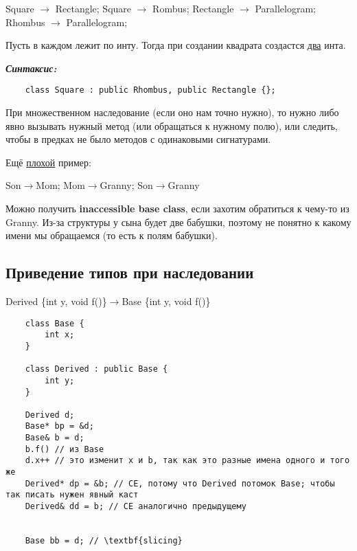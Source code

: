 \documentclass[12pt]{article}
\begin{document}
\begin{center}
	Square $\rightarrow$ Rectangle; Square $\rightarrow$ Rombus; Rectangle $\rightarrow$ Parallelogram; Rhombus $\rightarrow$ Parallelogram; 
\end{center}

Пусть в каждом лежит по инту. Тогда при создании квадрата создастся \underline{два} инта. 

\textbf{\textit{Синтаксис:}}

\begin{lstlisting}
	class Square : public Rhombus, public Rectangle {};
\end{lstlisting}

При множественном наследование (если оно нам точно нужно), то нужно либо явно вызывать нужный метод (или обращаться к нужному полю), или следить, чтобы в предках не было  методов с одинаковыми сигнатурами. 

Ещё \underline{плохой} пример:

\begin{center}
	Son$\rightarrow$Mom; Mom$\rightarrow$Granny; Son$\rightarrow$Granny
\end{center}

Можно получить \textbf{inaccessible base class}, если захотим обратиться к чему-то из Granny. Из-за структуры у сына будет две бабушки, поэтому не понятно к какому имени мы обращаемся (то есть к полям бабушки). 



\subsection{Приведение типов при наследовании}

\begin{center}
	Derived \{int y, void f()\}$\rightarrow$Base \{int y, void f()\}
\end{center}

\begin{lstlisting}
	class Base {
		int x;
	}
	
	class Derived : public Base {
		int y;
	}

	Derived d;
	Base* bp = &d;
	Base& b = d;
	b.f() // из Base
	d.x++ // это изменит x и b, так как это разные имена одного и того же 
	Derived* dp = &b; // CE, потому что Derived потомок Base; чтобы так писать нужен явный каст
	Derived& dd = b; // CE аналогично предыдущему
	
	
	Base bb = d; // \textbf{slicing}
\end{lstlisting}
\end{document}
